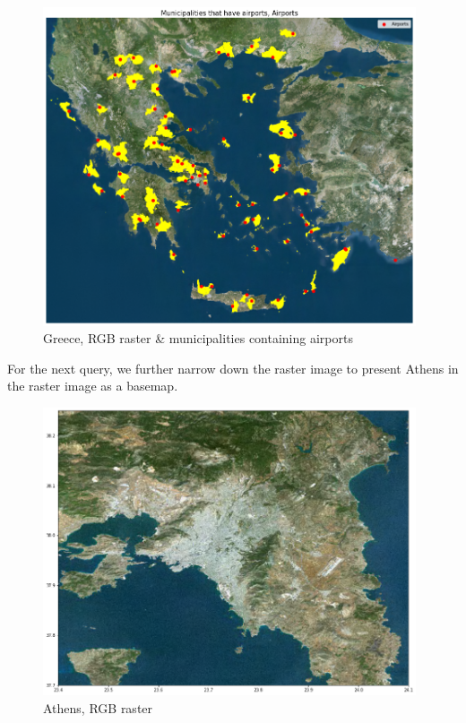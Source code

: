 \begin{figure}[h]
    \centering
    \includegraphics[width=11cm]{figures/q3_2_airports_and_municipalities_map.png}
    \caption{Greece, RGB raster & municipalities containing airports}
    \label{fig:Greece, RGB raster & municipalities containing airports}
\end{figure}
\FloatBarrier %

For the next query, we further narrow down the raster image to present Athens in the raster image as a basemap.

\begin{figure}[h]
    \centering
    \includegraphics[width=11cm]{figures/q3_2_athens_map.png}
    \caption{Athens, RGB raster}
    \label{fig:Athens, RGB raster}
\end{figure}
\FloatBarrier %

